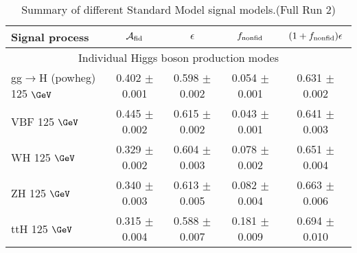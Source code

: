 
\begin{table}[!h!tb]
\begin{center}
\small
\caption{
Summary of different Standard Model signal models.(Full Run 2)
\label{tab:summarySM}
}
\begin{tabular}{|l|c|c|c|c|} \hline \hline 
\textbf{Signal process} & $\mathcal{A}_{\rm fid}$ & $\epsilon$ & $f_{\rm nonfid}$  & $(1+f_{\rm nonfid})\epsilon$ \\ \hline \hline 
\multicolumn{5}{|c|}{Individual Higgs boson production modes} \\ \hline 
gg$\rightarrow$H ({\sc powheg}) 125 $\GeV$ & 0.402 $\pm$ 0.001 & 0.598 $\pm$ 0.002 & 0.054 $\pm$ 0.001 & 0.631 $\pm$ 0.002 \\  
 VBF 125 $\GeV$ & 0.445 $\pm$ 0.002 & 0.615 $\pm$ 0.002 & 0.043 $\pm$ 0.001 & 0.641 $\pm$ 0.003 \\  
 WH 125 $\GeV$ & 0.329 $\pm$ 0.002 & 0.604 $\pm$ 0.003 & 0.078 $\pm$ 0.002 & 0.651 $\pm$ 0.004 \\  
 ZH 125 $\GeV$  & 0.340 $\pm$ 0.003 & 0.613 $\pm$ 0.005 & 0.082 $\pm$ 0.004 & 0.663 $\pm$ 0.006 \\  
 ttH 125 $\GeV$ & 0.315 $\pm$ 0.004 & 0.588 $\pm$ 0.007 & 0.181 $\pm$ 0.009 & 0.694 $\pm$ 0.010 \\  
 
\hline \hline
\end{tabular}
\normalsize
\end{center}
\end{table}














